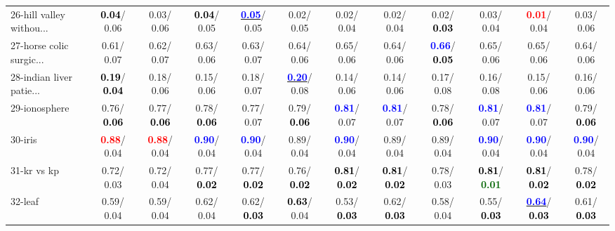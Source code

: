 \begin{table}[h]
\begin{center}
{\begin{tabular}{lc|c|c|c|c|c|c|c|c|c|c}
26-hill valley withou... & \textcolor{black}{\textbf{  0.04}}/  0.06 &   0.03/  0.06 & \textcolor{black}{\textbf{  0.04}}/  0.05 & \underline{\textcolor{blue}{\textbf{  0.05}}}/  0.05 &   0.02/  0.05 &   0.02/  0.04 &   0.02/  0.04 &   0.02/\textcolor{black}{\textbf{  0.03}} &   0.03/  0.04 & \textcolor{red}{\textbf{  0.01}}/  0.04 &   0.03/  0.06 \\
27-horse colic surgic... &   0.61/  0.07 &   0.62/  0.07 &   0.63/  0.06 &   0.63/  0.07 &   0.64/  0.06 &   0.65/  0.06 &   0.64/  0.06 & \textcolor{blue}{\textbf{  0.66}}/\textcolor{black}{\textbf{  0.05}} &   0.65/  0.06 &   0.65/  0.06 &   0.64/  0.06 \\
28-indian liver patie... & \textcolor{black}{\textbf{  0.19}}/\textcolor{black}{\textbf{  0.04}} &   0.18/  0.06 &   0.15/  0.06 &   0.18/  0.07 & \underline{\textcolor{blue}{\textbf{  0.20}}}/  0.08 &   0.14/  0.06 &   0.14/  0.06 &   0.17/  0.08 &   0.16/  0.08 &   0.15/  0.06 &   0.16/  0.06 \\ \hline
29-ionosphere &   0.76/\textcolor{black}{\textbf{  0.06}} &   0.77/\textcolor{black}{\textbf{  0.06}} &   0.78/\textcolor{black}{\textbf{  0.06}} &   0.77/  0.07 &   0.79/\textcolor{black}{\textbf{  0.06}} & \textcolor{blue}{\textbf{  0.81}}/  0.07 & \textcolor{blue}{\textbf{  0.81}}/  0.07 &   0.78/\textcolor{black}{\textbf{  0.06}} & \textcolor{blue}{\textbf{  0.81}}/  0.07 & \textcolor{blue}{\textbf{  0.81}}/  0.07 &   0.79/\textcolor{black}{\textbf{  0.06}} \\
30-iris & \textcolor{red}{\textbf{  0.88}}/  0.04 & \textcolor{red}{\textbf{  0.88}}/  0.04 & \textcolor{blue}{\textbf{  0.90}}/  0.04 & \textcolor{blue}{\textbf{  0.90}}/  0.04 &   0.89/  0.04 & \textcolor{blue}{\textbf{  0.90}}/  0.04 &   0.89/  0.04 &   0.89/  0.04 & \textcolor{blue}{\textbf{  0.90}}/  0.04 & \textcolor{blue}{\textbf{  0.90}}/  0.04 & \textcolor{blue}{\textbf{  0.90}}/  0.04 \\
31-kr vs kp &   0.72/  0.03 &   0.72/  0.04 &   0.77/\textcolor{black}{\textbf{  0.02}} &   0.77/\textcolor{black}{\textbf{  0.02}} &   0.76/\textcolor{black}{\textbf{  0.02}} & \textcolor{black}{\textbf{  0.81}}/\textcolor{black}{\textbf{  0.02}} & \textcolor{black}{\textbf{  0.81}}/\textcolor{black}{\textbf{  0.02}} &   0.78/  0.03 & \textcolor{black}{\textbf{  0.81}}/\textcolor{darkgreen}{\textbf{  0.01}} & \textcolor{black}{\textbf{  0.81}}/\textcolor{black}{\textbf{  0.02}} &   0.78/\textcolor{black}{\textbf{  0.02}} \\
32-leaf &   0.59/  0.04 &   0.59/  0.04 &   0.62/  0.04 &   0.62/\textcolor{black}{\textbf{  0.03}} & \textcolor{black}{\textbf{  0.63}}/  0.04 &   0.53/\textcolor{black}{\textbf{  0.03}} &   0.62/\textcolor{black}{\textbf{  0.03}} &   0.58/  0.04 &   0.55/\textcolor{black}{\textbf{  0.03}} & \underline{\textcolor{blue}{\textbf{  0.64}}}/\textcolor{black}{\textbf{  0.03}} &   0.61/\textcolor{black}{\textbf{  0.03}} \\\end{tabular}}\label{stratsALCKappa0aRFwRedux}
\end{center}
\end{table}
